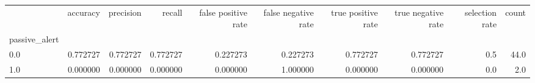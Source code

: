 \begin{tabular}{lrrrrrrrrr}
\toprule
{} &  accuracy &  precision &    recall &  false positive rate &  false negative rate &  true positive rate &  true negative rate &  selection rate &  count \\
passive\_alert &           &            &           &                      &                      &                     &                     &                 &        \\
\midrule
0.0           &  0.772727 &   0.772727 &  0.772727 &             0.227273 &             0.227273 &            0.772727 &            0.772727 &             0.5 &   44.0 \\
1.0           &  0.000000 &   0.000000 &  0.000000 &             0.000000 &             1.000000 &            0.000000 &            0.000000 &             0.0 &    2.0 \\
\bottomrule
\end{tabular}
